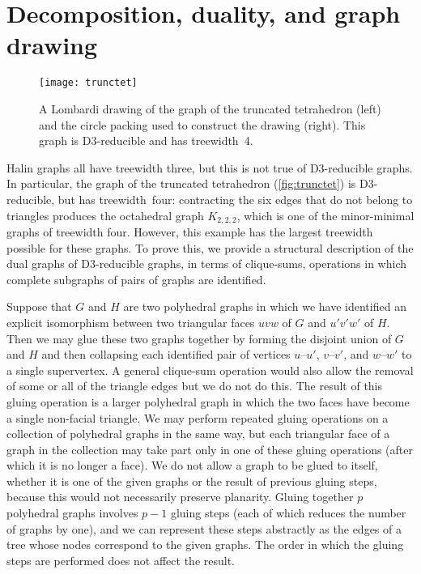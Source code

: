 \documentclass{article}
\begin{document}
\section{Decomposition, duality, and graph drawing}

\begin{figure}[b]
\centering\texttt{[image: trunctet]}
\caption{A Lombardi drawing of the graph of the truncated tetrahedron (left) and the circle packing used to construct the drawing (right). This graph is D3-reducible and has treewidth~4.}
\label{fig:trunctet}
\end{figure}

Halin graphs all have treewidth three, but this is not true of D3-reducible graphs. In particular, the graph of the truncated tetrahedron (\autoref{fig:trunctet}) is D3-reducible, but has treewidth~four: contracting the six edges that do not belong to triangles produces the octahedral graph $K_{2,2,2}$, which is one of the minor-minimal graphs of treewidth four. However, this example has the largest treewidth possible for these graphs. To prove this, we provide a structural description of the dual graphs of D3-reducible graphs, in terms of clique-sums, operations in which complete subgraphs of pairs of graphs are identified.

Suppose that $G$ and $H$ are two polyhedral graphs in which we have identified an explicit isomorphism between two triangular faces $uvw$ of $G$ and $u'v'w'$ of $H$. Then we may glue these two graphs together by forming the disjoint union of $G$ and $H$ and then collapsing each identified pair of vertices $u$--$u'$, $v$--$v'$, and $w$--$w'$ to a single supervertex. A general clique-sum operation would also allow the removal of some or all of the triangle edges but we do not do this. The result of this gluing operation is a larger polyhedral graph in which the two faces have become a single non-facial triangle. We may perform repeated gluing operations on a collection of polyhedral graphs in the same way, but each triangular face of a graph in the collection may take part only in one of these gluing operations (after which it is no longer a face). We do not allow a graph to be glued to itself, whether it is one of the given graphs or the result of previous gluing steps, because this would not necessarily preserve planarity. Gluing together $p$ polyhedral graphs involves $p-1$ gluing steps (each of which reduces the number of graphs by one), and we can represent these steps abstractly as the edges of a tree whose nodes correspond to the given graphs. The order in which the gluing steps are performed does not affect the result.
\end{document}
